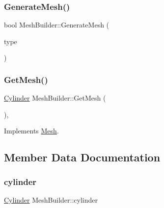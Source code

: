 \mbox{\label{class_mesh_builder_a9c48199d6ecab1f9c102e48d1b474f5a}} 
\subsubsection{\texorpdfstring{GenerateMesh()}{GenerateMesh()}}
{\footnotesize\ttfamily bool Mesh\+Builder\+::\+Generate\+Mesh (\begin{DoxyParamCaption}\item[{\mbox{\hyperlink{_abstract_factory_2_abstract_factory_2builder_2_mesh_builder_8h_ad6436347ddb93aed826a19081b53dd61}{M\+E\+S\+H\+T\+Y\+PE}}}]{type }\end{DoxyParamCaption})}

\mbox{\label{class_mesh_builder_a2db99e42ca33437243c6875a85417ef0}} 
\subsubsection{\texorpdfstring{GetMesh()}{GetMesh()}}
{\footnotesize\ttfamily \mbox{\hyperlink{class_cylinder}{Cylinder}} Mesh\+Builder\+::\+Get\+Mesh (\begin{DoxyParamCaption}{ }\end{DoxyParamCaption})\hspace{0.3cm}{\ttfamily [inline]}, {\ttfamily [virtual]}}



Implements \mbox{\hyperlink{class_mesh_ac9a0bc76a4e34c3985cbc4c20692c7df}{Mesh}}.



\subsection{Member Data Documentation}
\mbox{\label{class_mesh_builder_aba5364c12c71c36af6a83b6c3853af5b}} 
\subsubsection{\texorpdfstring{cylinder}{cylinder}}
{\footnotesize\ttfamily \mbox{\hyperlink{class_cylinder}{Cylinder}} Mesh\+Builder\+::cylinder\hspace{0.3cm}{\ttfamily [protected]}}

